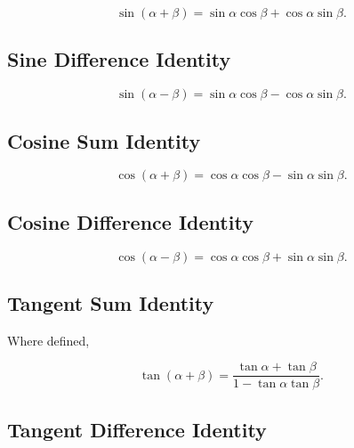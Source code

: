 \[
\boxed{
\sin(\alpha+\beta)
=
\sin\alpha\cos\beta
+
\cos\alpha\sin\beta.
}
\]

\subsection{Sine Difference Identity}
\label{subsec:sine-difference-identity}

\[
\boxed{
\sin(\alpha-\beta)
=
\sin\alpha\cos\beta
-
\cos\alpha\sin\beta.
}
\]

\subsection{Cosine Sum Identity}
\label{subsec:cosine-sum-identity}

\[
\boxed{
\cos(\alpha+\beta)
=
\cos\alpha\cos\beta
-
\sin\alpha\sin\beta.
}
\]

\subsection{Cosine Difference Identity}
\label{subsec:cosine-difference-identity}

\[
\boxed{
\cos(\alpha-\beta)
=
\cos\alpha\cos\beta
+
\sin\alpha\sin\beta.
}
\]

\subsection{Tangent Sum Identity}
\label{subsec:tangent-sum-identity}

Where defined,

\[
\boxed{
\tan(\alpha+\beta)
=
\frac{
\tan\alpha+\tan\beta
}{
1-\tan\alpha\tan\beta
}.
}
\]

\subsection{Tangent Difference Identity}
\label{subsec:tangent-difference-identity}

